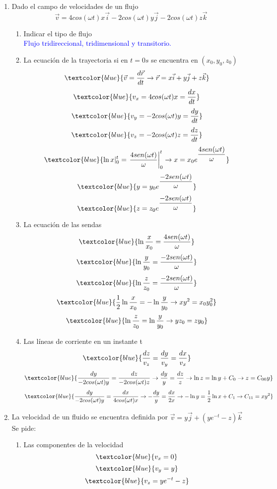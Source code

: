\begin{enumerate}
	\item Dado el campo de velocidades de un flujo
	\[\vec{v}=4cos(\omega t)x\vec{i}-2cos(\omega t)y\vec{j}-2cos(\omega t)z\vec{k}\]
	\begin{enumerate}
		\item Indicar el tipo de flujo\\
		\textcolor{blue}{Flujo tridireccional, tridimensional y transitorio.}
		\item La ecuación de la trayectoria si en $t=0s$ se encuentra en $(x_0,y_0,z_0)$
		\[\textcolor{blue}{\vec{v}=\dfrac{d\vec{r}}{dt} \rightarrow \vec{r}=x\vec{i}+y\vec{j}+z\vec{k}}\]
		\[\textcolor{blue}{v_x=4cos(\omega t)x=\dfrac{dx}{dt}}\]
		\[\textcolor{blue}{v_y= -2cos(\omega t)y = \dfrac{dy}{dt}}\]
		\[\textcolor{blue}{v_z= -2cos(\omega t)z = \dfrac{dz}{dt}} \]
		\[\textcolor{blue}{\ln x|_0^t=\left.{\dfrac{4sen(\omega t)}{\omega}}\right |_0^t \rightarrow x=x_0 e^{\dfrac{4sen(\omega t)}{\omega}}}\]
		\[\textcolor{blue}{y=y_0 e^{\dfrac{-2sen(\omega t)}{\omega}}}\]
		\[\textcolor{blue}{z=z_0 e^{\dfrac{-2sen(\omega t)}{\omega}}}\]
		\item La ecuación de las sendas
		\[\textcolor{blue}{\ln \dfrac{x}{x_0}=\dfrac{4sen(\omega t)}{\omega}}\]
		\[\textcolor{blue}{\ln \dfrac{y}{y_0}=\dfrac{-2sen(\omega t)}{\omega}}\]
		\[\textcolor{blue}{\ln \dfrac{z}{z_0}=\dfrac{-2sen(\omega t)}{\omega}}\]
		\[\textcolor{blue}{\dfrac{1}{2}\ln \dfrac{x}{x_0}=-\ln \dfrac{y}{y_0} \rightarrow xy^2=x_0y_0^2}\]
		\[\textcolor{blue}{\ln \dfrac{z}{z_0}=\ln \dfrac{y}{y_0} \rightarrow yz_0=zy_0}\]
		\item Las líneas de corriente en un instante t
		\[\textcolor{blue}{\dfrac{dz}{v_z}=\dfrac{dy}{v_y}=\dfrac{dx}{v_x}}\]
		\[\textcolor{blue}{\dfrac{dy}{-2cos(\omega t)y}=\dfrac{dz}{-2cos(\omega t)z}\rightarrow \dfrac{dy}{y}=\dfrac{dz}{z}\rightarrow \ln z = \ln y + C_0 \rightarrow z=C_{00}y}\]
		\[\textcolor{blue}{\dfrac{dy}{-2cos(\omega t)y}=\dfrac{dx}{4cos(\omega t)x}\rightarrow -\dfrac{dy}{y}=\dfrac{dx}{2x}\rightarrow -\ln y = \dfrac{1}{2}\ln x + C_1 \rightarrow C_{11}=xy^2 }\]
	\end{enumerate}
	\newpage
	\item La velocidad de un fluido se encuentra definida por $\vec{v}=y\vec{j}+\left(ye^{-t}-z\right)\vec{k}$ Se pide:
	\begin{enumerate}
		\item Las componentes de la velocidad 
		\[\textcolor{blue}{v_x=0} \]
		\[	\textcolor{blue}{ v_y=y}\] 
			\[\textcolor{blue}{ v_z=ye^{-t} -z}\]

\end{enumerate}
\end{enumerate}
